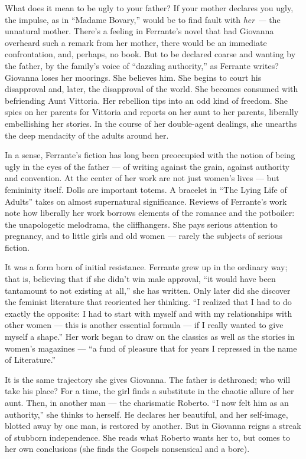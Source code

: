 What does it mean to be ugly to your father? If your mother declares you
ugly, the impulse, as in ``Madame Bovary,'' would be to find fault with
\emph{her ---} the unnatural mother. There's a feeling in Ferrante's
novel that had Giovanna overheard such a remark from her mother, there
would be an immediate confrontation, and, perhaps, no book. But to be
declared coarse and wanting by the father, by the family's voice of
``dazzling authority,'' as Ferrante writes? Giovanna loses her moorings.
She believes him. She begins to court his disapproval and, later, the
disapproval of the world. She becomes consumed with befriending Aunt
Vittoria. Her rebellion tips into an odd kind of freedom. She spies on
her parents for Vittoria and reports on her aunt to her parents,
liberally embellishing her stories. In the course of her double-agent
dealings, she unearths the deep mendacity of the adults around her.

In a sense, Ferrante's fiction has long been preoccupied with the notion
of being ugly in the eyes of the father --- of writing against the
grain, against authority and convention. At the center of her work are
not just women's lives --- but femininity itself. Dolls are important
totems. A bracelet in ``The Lying Life of Adults'' takes on almost
supernatural significance. Reviews of Ferrante's work note how liberally
her work borrows elements of the romance and the potboiler: the
unapologetic melodrama, the cliffhangers. She pays serious attention to
pregnancy, and to little girls and old women --- rarely the subjects of
serious fiction.

It was a form born of initial resistance. Ferrante grew up in the
ordinary way; that is, believing that if she didn't win male approval,
``it would have been tantamount to not existing at all,'' she has
written. Only later did she discover the feminist literature that
reoriented her thinking. ``I realized that I had to do exactly the
opposite: I had to start with myself and with my relationships with
other women --- this is another essential formula --- if I really wanted
to give myself a shape.'' Her work began to draw on the classics as well
as the stories in women's magazines --- ``a fund of pleasure that for
years I repressed in the name of Literature.''

It is the same trajectory she gives Giovanna. The father is dethroned;
who will take his place? For a time, the girl finds a substitute in the
chaotic allure of her aunt. Then, in another man --- the charismatic
Roberto. ``I now felt him as an authority,'' she thinks to herself. He
declares her beautiful, and her self-image, blotted away by one man, is
restored by another. But in Giovanna reigns a streak of stubborn
independence. She reads what Roberto wants her to, but comes to her own
conclusions (she finds the Gospels nonsensical and a bore).

